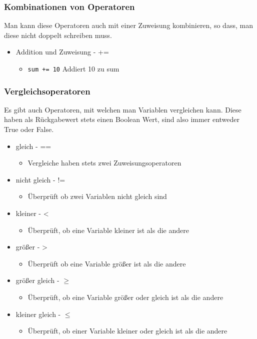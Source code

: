 \documentclass{article}
\begin{document}
	\subsubsection{Kombinationen von Operatoren}
	Man kann diese Operatoren auch mit einer Zuweisung kombinieren, so dass, man diese nicht doppelt schreiben muss.
	\begin{itemize}
		\item{Addition und Zuweisung - +=}
		\begin{itemize}
			\item{\verb|sum += 10| Addiert 10 zu sum }
		\end{itemize}
	\end{itemize}
	\subsubsection{Vergleichsoperatoren}
	Es gibt auch Operatoren, mit welchen man Variablen vergleichen kann. Diese haben als Rückgabewert stets einen Boolean Wert, sind also immer entweder True oder False.
	\begin{itemize}
		\item{gleich - ==}
		\begin{itemize}
			\item{Vergleiche haben stets zwei Zuweisungsoperatoren}
		\end{itemize}
		\item{nicht gleich - !=}
		\begin{itemize}
			\item{Überprüft ob zwei Variablen nicht gleich sind}
		\end{itemize}
		\item{kleiner - <}
		\begin{itemize}
			\item{Überprüft, ob eine Variable kleiner ist als die andere}
		\end{itemize}
		\item{größer - >}
		\begin{itemize}
			\item{Überprüft ob eine Variable größer ist als die andere}
		\end{itemize}
		\item{größer gleich - $\geq$}
		\begin{itemize}
			\item{Überprüft, ob eine Variable größer oder gleich ist als die andere}
		\end{itemize}
		\item{kleiner gleich - $\leq$}
		\begin{itemize}
			\item{Überprüft, ob einer Variable kleiner oder gleich ist als die andere}
		\end{itemize}
	\end{itemize}
\end{document}
